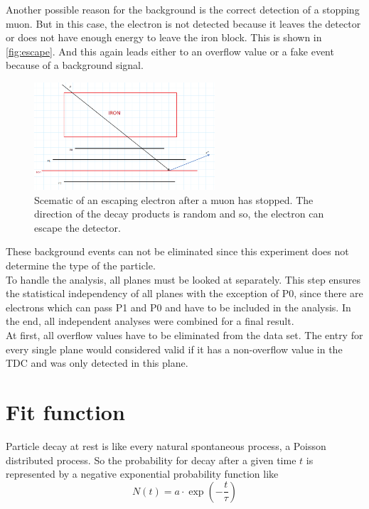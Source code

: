 Another possible reason for the background is the correct detection of a stopping muon. 
But in this case, the electron is not detected because it leaves the detector or does not
have enough energy to leave the iron block. This is shown in \autoref{fig:escape}.
And this again leads either to an overflow value or a fake event because of a background signal.

\begin{figure}
	 \centering
	 \includegraphics[width=0.6\textwidth]{figures/electron_escape.png}
	 \caption{Scematic of an escaping electron after a muon has stopped. The direction of the decay products is random and so, the electron can escape the detector.}
	 \label{fig:escape}
\end{figure}

These background events can not be eliminated since this experiment does not
determine the type of the particle.\\
To handle the analysis, all planes must be looked at separately.
This step ensures the statistical independency of all planes with the exception of P0, since there 
are electrons which can pass P1 and P0 and have to be included in the analysis.
In the end, all independent analyses were combined for a final result.\\
At first, all overflow values have to be eliminated from the data set.
The entry for every single plane would considered valid if it has a non-overflow value
in the TDC and was only detected in this plane.

\section{Fit function}
Particle decay at rest is like every natural spontaneous process, a Poisson distributed process. So the probability for decay after a given time $t$ is represented by a negative exponential probability function
like 
\begin{equation*}
    N(t) = a \cdot \exp\left(- \frac{t}{\tau}\right)
\end{equation*}

